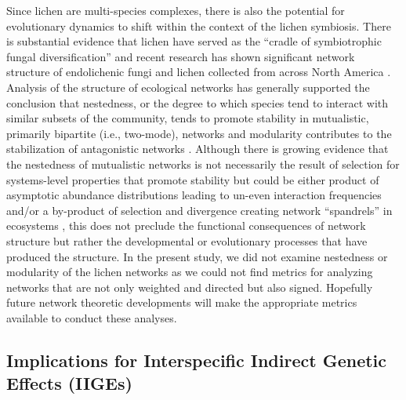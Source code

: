 \documentclass[fleqn,12pt]{olplainarticle}
\begin{document}
Since lichen are multi-species complexes, there is also the potential
for evolutionary dynamics to shift within the context of the lichen
symbiosis. There is substantial evidence that lichen have served as
the ``cradle of symbiotrophic fungal diversification''
\cite{Arnold2009ADiversification} and recent research has shown
significant network structure of endolichenic fungi and lichen
collected from across North America
\cite{Chagnon2016InteractionScale}. Analysis of the structure of
ecological networks has generally supported the conclusion that
nestedness, or the degree to which species tend to interact with
similar subsets of the community, tends to promote stability in
mutualistic, primarily bipartite (i.e., two-mode), networks and
modularity contributes to the stabilization of antagonistic networks
\cite{Elias2013EvolutionaryNetwork,
  Grilli2016ModularityCommunities}. Although there is growing evidence
that the nestedness of mutualistic networks is not necessarily the
result of selection for systems-level properties that promote
stability but could be either product of asymptotic abundance
distributions leading to un-even interaction frequencies
\cite{Staniczenko2013TheNetworks} and/or a by-product of selection and
divergence creating network ``spandrels'' in ecosystems
\cite{Valverde2018TheSpandrel}, this does not preclude the functional
consequences of network structure but rather the developmental or
evolutionary processes that have produced the structure. In the
present study, we did not examine nestedness or modularity of the
lichen networks as we could not find metrics for analyzing networks
that are not only weighted and directed but also signed. Hopefully
future network theoretic developments will make the appropriate
metrics available to conduct these analyses.

\subsection*{Implications for Interspecific Indirect Genetic Effects (IIGEs)}
\end{document}
